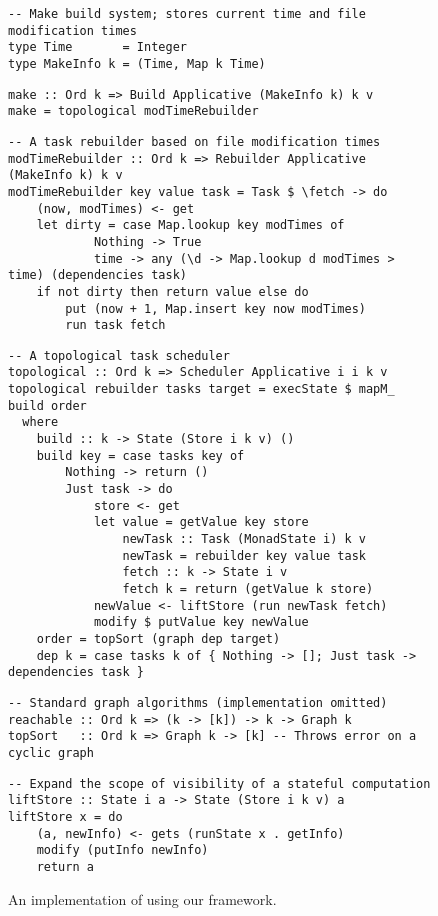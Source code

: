 \begin{figure}
\begin{verbatim}
-- Make build system; stores current time and file modification times
type Time       = Integer
type MakeInfo k = (Time, Map k Time)
\end{verbatim}
\vspace{0mm}
\begin{verbatim}
make :: Ord k => Build Applicative (MakeInfo k) k v
make = topological modTimeRebuilder
\end{verbatim}
\vspace{0mm}
\begin{verbatim}
-- A task rebuilder based on file modification times
modTimeRebuilder :: Ord k => Rebuilder Applicative (MakeInfo k) k v
modTimeRebuilder key value task = Task $ \fetch -> do
    (now, modTimes) <- get
    let dirty = case Map.lookup key modTimes of
            Nothing -> True
            time -> any (\d -> Map.lookup d modTimes > time) (dependencies task)
    if not dirty then return value else do
        put (now + 1, Map.insert key now modTimes)
        run task fetch
\end{verbatim}
\vspace{0mm}
\begin{verbatim}
-- A topological task scheduler
topological :: Ord k => Scheduler Applicative i i k v
topological rebuilder tasks target = execState $ mapM_ build order
  where
    build :: k -> State (Store i k v) ()
    build key = case tasks key of
        Nothing -> return ()
        Just task -> do
            store <- get
            let value = getValue key store
                newTask :: Task (MonadState i) k v
                newTask = rebuilder key value task
                fetch :: k -> State i v
                fetch k = return (getValue k store)
            newValue <- liftStore (run newTask fetch)
            modify $ putValue key newValue
    order = topSort (graph dep target)
    dep k = case tasks k of { Nothing -> []; Just task -> dependencies task }
\end{verbatim}
\vspace{0mm}
\begin{verbatim}
-- Standard graph algorithms (implementation omitted)
reachable :: Ord k => (k -> [k]) -> k -> Graph k
topSort   :: Ord k => Graph k -> [k] -- Throws error on a cyclic graph
\end{verbatim}
\vspace{0mm}
\begin{verbatim}
-- Expand the scope of visibility of a stateful computation
liftStore :: State i a -> State (Store i k v) a
liftStore x = do
    (a, newInfo) <- gets (runState x . getInfo)
    modify (putInfo newInfo)
    return a
\end{verbatim}
\vspace{-3mm}
\caption{An implementation of \Make using our framework.}\label{fig-make-implementation}
\vspace{-5mm}
\end{figure}

